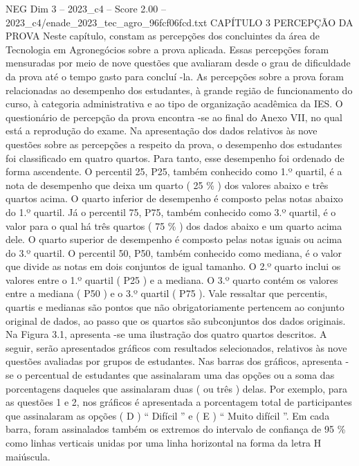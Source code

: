 \begin{textsample}{NEG Dim 3 – 2023\_c4 – Score 2.00 – 2023\_c4/enade\_2023\_tec\_agro\_96fcf06fcd.txt}  \label{ex:f3_neg_206}
CAPÍTULO 3 PERCEPÇÃO DA PROVA Neste capítulo, constam as percepções dos concluintes da área de Tecnologia em Agronegócios sobre a prova aplicada.
Essas percepções foram mensuradas por meio de nove questões que avaliaram desde o grau de dificuldade da prova até o tempo gasto para concluí -la.
As percepções sobre a prova foram relacionadas ao desempenho dos estudantes, à grande região de funcionamento do curso, à categoria administrativa e ao tipo de organização acadêmica da IES.
O questionário de percepção da prova encontra -se ao final do Anexo VII, no qual está a reprodução do exame.
Na apresentação dos dados relativos às nove questões sobre as percepções a respeito da prova, o desempenho dos estudantes foi classificado em quatro quartos.
Para tanto, esse desempenho foi ordenado de forma ascendente.
O percentil 25, P25, também conhecido como 1.º quartil, é a nota de desempenho que deixa um quarto ( 25 \% ) dos valores abaixo e três quartos acima.
O quarto inferior de desempenho é composto pelas notas abaixo do 1.º quartil.
Já o percentil 75, P75, também conhecido como 3.º quartil, é o valor para o qual há três quartos ( 75 \% ) dos dados abaixo e um quarto acima dele.
O quarto superior de desempenho é composto pelas notas iguais ou acima do 3.º quartil.
O percentil 50, P50, também conhecido como mediana, é o valor que divide as notas em dois conjuntos de igual tamanho.
O 2.º quarto inclui os valores entre o 1.º quartil ( P25 ) e a mediana.
O 3.º quarto contém os valores entre a mediana ( P50 ) e o 3.º quartil ( P75 ).
Vale ressaltar que percentis, quartis e medianas são pontos que não obrigatoriamente pertencem ao conjunto original de dados, ao passo que os quartos são subconjuntos dos dados originais.
Na Figura 3.1, apresenta -se uma ilustração dos quatro quartos descritos.
A seguir, serão apresentados gráficos com resultados selecionados, relativos às nove questões avaliadas por grupos de estudantes.
Nas barras dos gráficos, apresenta -se o percentual de estudantes que assinalaram uma das opções ou a soma das porcentagens daqueles que assinalaram duas ( ou três ) delas.
Por exemplo, para as questões 1 e 2, nos gráficos é apresentada a porcentagem total de participantes que assinalaram as opções ( D ) “ Difícil ” e ( E ) “ Muito difícil ”.
Em cada barra, foram assinalados também os extremos do intervalo de confiança de 95 \% como linhas verticais unidas por uma linha horizontal na forma da letra H maiúscula.

\end{textsample}
